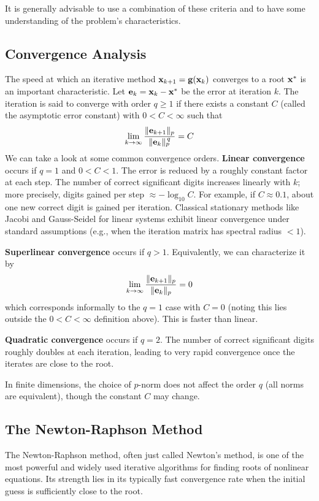 It is generally advisable to use a combination of these criteria and to have some understanding of the problem's characteristics.

\subsection{Convergence Analysis}
The speed at which an iterative method $\mathbf{x}_{k+1} = \mathbf{g}(\mathbf{x}_k)$ converges to a root $\mathbf{x}^*$ is an important characteristic. Let $\mathbf{e}_k = \mathbf{x}_k - \mathbf{x}^*$ be the error at iteration $k$. The iteration is said to converge with order $q \ge 1$ if there exists a constant $C$ (called the asymptotic error constant) with $0<C<\infty$ such that
\[
    \lim_{k\to\infty} \frac{\|\mathbf{e}_{k+1}\|_p}{\|\mathbf{e}_k\|_p^{\,q}} = C
\]
We can take a look at some common convergence orders. \textbf{Linear convergence} occurs if $q=1$ and $0<C<1$. The error is reduced by a roughly constant factor at each step. The number of correct significant digits increases linearly with $k$; more precisely, digits gained per step $\approx -\log_{10} C$. For example, if $C \approx 0.1$, about one new correct digit is gained per iteration. Classical stationary methods like Jacobi and Gauss-Seidel for linear systems exhibit linear convergence under standard assumptions (e.g., when the iteration matrix has spectral radius $<1$).

\textbf{Superlinear convergence} occurs if $q>1$. Equivalently, we can characterize it by
\[
  \lim_{k\to\infty}\frac{\|\mathbf{e}_{k+1}\|_p}{\|\mathbf{e}_k\|_p}=0
\]
which corresponds informally to the $q=1$ case with $C=0$ (noting this lies outside the $0<C<\infty$ definition above). This is faster than linear.

\textbf{Quadratic convergence} occurs if $q=2$. The number of correct significant digits roughly doubles at each iteration, leading to very rapid convergence once the iterates are close to the root.

In finite dimensions, the choice of $p$-norm does not affect the order $q$ (all norms are equivalent), though the constant $C$ may change.



\subsection{The Newton-Raphson Method}
The Newton-Raphson method, often just called Newton's method, is one of the most powerful and widely used iterative algorithms for finding roots of nonlinear equations. Its strength lies in its typically fast convergence rate when the initial guess is sufficiently close to the root.

